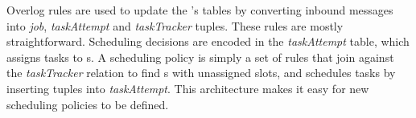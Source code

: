 


Overlog rules are used to update the {\JT}'s tables by converting inbound messages
into \emph{job}, \emph{taskAttempt} and \emph{taskTracker} tuples. These rules
are mostly straightforward. Scheduling decisions are encoded in the
\emph{taskAttempt} table, which assigns tasks to {\TT}s. A scheduling policy is
simply a set of rules that join against the \emph{taskTracker} relation to find
\TT{}s with unassigned slots, and schedules tasks by inserting tuples into
\emph{taskAttempt}. This architecture makes it easy for new scheduling policies
to be defined.


